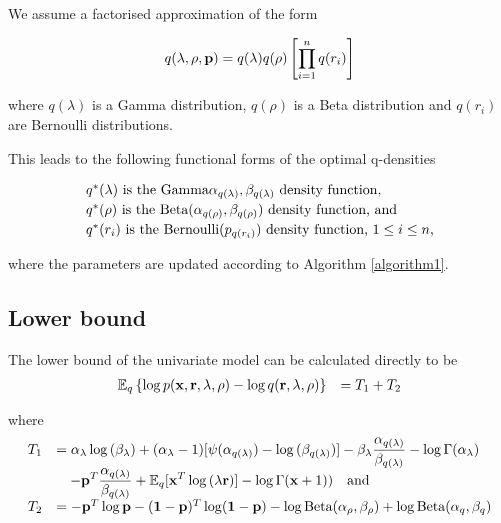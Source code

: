 \documentclass{article}[12pt]
\begin{document}
\noindent We assume a factorised approximation of the form

$$
q(\lambda, \rho, {\bf p}) = q(\lambda) q(\rho) \left [ \prod_{i=1}^n q(r_i) \right ]
$$

\noindent where $q(\lambda)$ is a Gamma distribution, $q(\rho)$ is a Beta distribution 
and $q(r_i)$ are Bernoulli distributions.

\noindent This leads to the following functional forms of the optimal q-densities

$$
\begin{array}{l}
\mbox{$q^*(\lambda)$ is the $\text{Gamma} \alpha_{q(\lambda)}, \beta_{q(\lambda)}$ density function,} \\ [0.5ex]
\mbox{$q^*(\rho)$ is the $\text{Beta}(\alpha_{q(\rho)}, \beta_{q(\rho)})$ density function, and} \\ [0.5ex]
\mbox{$q^*(r_i)$  is the $\text{Bernoulli}(p_{q(r_i)})$ density function, $1 \leq i \leq n$,}
\end{array}
$$


\noindent where the parameters are updated according to Algorithm \ref{algorithm1}. 

\subsection{Lower bound}
The lower bound of the univariate model can be calculated directly to be
$$
\begin{array}{rl}
{\mathbb E}_q \left\{ \log{p({\bf x}, {\bf r}, \lambda, \rho)} - \log{q({\bf r}, \lambda, \rho)} \right\} &= T_1 + T_2 \\
\end{array}
$$

\noindent where
$$
\begin{array}{rl}
T_1 & \displaystyle =
\alpha_\lambda \log{(\beta_\lambda)} + (\alpha_\lambda - 1) [\psi(\alpha_{q(\lambda)}) - \log{(\beta_{q(\lambda)})}] - \beta_\lambda \frac{\alpha_{q(\lambda)}}{\beta_{q(\lambda)}} - \log\Gamma(\alpha_\lambda) \\
& \displaystyle \quad -{\bf p}^T\frac{\alpha_{q(\lambda)}}{\beta_{q(\lambda)}} + {\mathbb E}_q[{\bf x}^T \log{(\lambda {\bf r})}] - \log\Gamma({\bf x}+1)) \quad \mbox{and} 
\\ [1ex]
T_2 &= - {\bf p}^T \log {\bf p} - ({\bf 1} - {\bf p})^T \log ({\bf 1} - {\bf p}) - \log \text{Beta} (\alpha_\rho, \beta_\rho) + \log \text{Beta} (\alpha_q, \beta_q)
\end{array}
$$
\end{document}
